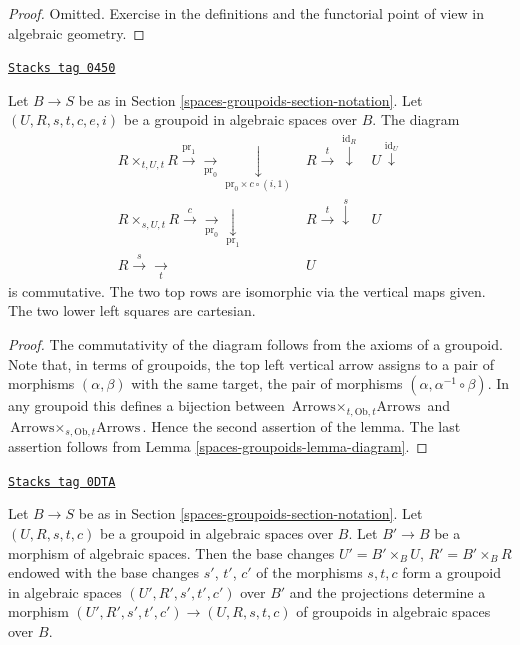 \begin{proof}
Omitted.
Exercise in the definitions and the functorial point of
view in algebraic geometry.
\end{proof}

\begin{lemma}
\label{spaces-groupoids-lemma-diagram-pull}
\href{https://stacks.math.columbia.edu/tag/0450}{\texttt{Stacks tag 0450}}

Let $B \to S$ be as in Section \ref{spaces-groupoids-section-notation}.
Let $(U, R, s, t, c, e, i)$ be a groupoid in algebraic spaces over $B$.
The diagram
\begin{equation}
\label{equation-pull}
\begin{array}{ccc}R \times_{t, U, t} R
\overset{\text{pr}_1}{\longrightarrow}\underset{\text{pr}_0}{\longrightarrow}\underset{\text{pr}_0 \times c \circ (i, 1)}{\downarrow} & R \overset{t}{\longrightarrow}\overset{\text{id}_R}{\downarrow} & U \overset{\text{id}_U}{\downarrow} \\ R \times_{s, U, t} R
\overset{c}{\longrightarrow}\underset{\text{pr}_0}{\longrightarrow}\underset{\text{pr}_1}{\downarrow} & R \overset{t}{\longrightarrow}\overset{s}{\downarrow} & U \\ R \overset{s}{\longrightarrow}\underset{t}{\longrightarrow} & U & \end{array}
\end{equation}
is commutative. The two top rows are isomorphic via the vertical maps given.
The two lower left squares are cartesian.
\end{lemma}

\begin{proof}
The commutativity of the diagram follows from the axioms of a groupoid.
Note that, in terms of groupoids, the top left vertical arrow assigns to
a pair of morphisms $(\alpha, \beta)$ with the same target, the pair
of morphisms $(\alpha, \alpha^{-1} \circ \beta)$. In any groupoid
this defines a bijection between
$\text{Arrows} \times_{t, \text{Ob}, t} \text{Arrows}$
and
$\text{Arrows} \times_{s, \text{Ob}, t} \text{Arrows}$. Hence the second
assertion of the lemma.
The last assertion follows from Lemma \ref{spaces-groupoids-lemma-diagram}.
\end{proof}

\begin{lemma}
\label{spaces-groupoids-lemma-base-change-groupoid}
\href{https://stacks.math.columbia.edu/tag/0DTA}{\texttt{Stacks tag 0DTA}}

Let $B \to S$ be as in Section \ref{spaces-groupoids-section-notation}.
Let $(U, R, s, t, c)$ be a groupoid in algebraic spaces over $B$.
Let $B' \to B$ be a morphism of algebraic spaces.
Then the base changes $U' = B' \times_B U$,
$R' = B' \times_B R$ endowed with the base changes $s'$, $t'$, $c'$
of the morphisms $s, t, c$ form a groupoid in algebraic spaces
$(U', R', s', t', c')$ over $B'$ and the projections
determine a morphism
$(U', R', s', t', c') \to (U, R, s, t, c)$
of groupoids in algebraic spaces over $B$.
\end{lemma}

